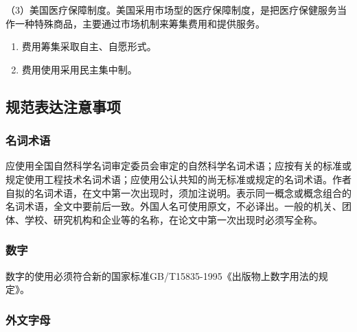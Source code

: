 （3）美国医疗保障制度。美国采用市场型的医疗保障制度，是把医疗保健服务当作一种特殊商品，主要通过市场机制来筹集费用和提供服务。

\begin{enumerate}[label=\circledtext{\arabic*}]
  \item{费用筹集采取自主、自愿形式。}
  \item{费用使用采用民主集中制。}
\end{enumerate}

\subsection{规范表达注意事项}

\subsubsection{名词术语}

应使用全国自然科学名词审定委员会审定的自然科学名词术语；应按有关的标准或规定使用工程技术名词术语；应使用公认共知的尚无标准或规定的名词术语。作者自拟的名词术语，在文中第一次出现时，须加注说明。表示同一概念或概念组合的名词术语，全文中要前后一致。外国人名可使用原文，不必译出。一般的机关、团体、学校、研究机构和企业等的名称，在论文中第一次出现时必须写全称。

\subsubsection{数字}

数字的使用必须符合新的国家标准GB/T15835-1995《出版物上数字用法的规定》。

\subsubsection{外文字母}

